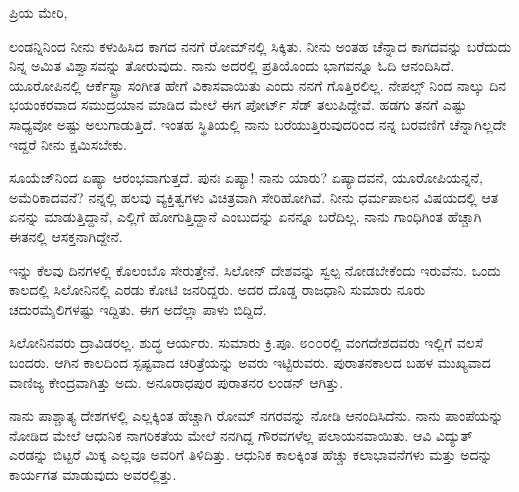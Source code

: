 \noindent
ಪ್ರಿಯ ಮೇರಿ,

ಲಂಡನ್ನಿನಿಂದ ನೀನು ಕಳುಹಿಸಿದ ಕಾಗದ ನನಗೆ ರೋಮ್‌ನಲ್ಲಿ ಸಿಕ್ಕಿತು. ನೀನು ಅಂತಹ ಚೆನ್ನಾದ ಕಾಗದವನ್ನು ಬರೆದುದು ನಿನ್ನ ಅಮಿತ ವಿಶ್ವಾಸವನ್ನು ತೋರುವುದು. ನಾನು ಅದರಲ್ಲಿ ಪ್ರತಿಯೊಂದು ಭಾಗವನ್ನೂ ಓದಿ ಆನಂದಿಸಿದೆ. ಯೂರೋಪಿನಲ್ಲಿ ಆರ್ಕೆಸ್ಟ್ರಾ ಸಂಗೀತ ಹೇಗೆ ವಿಕಾಸವಾಯಿತು ಎಂದು ನನಗೆ ಗೊತ್ತಿರಲಿಲ್ಲ. ನೇಪಲ್ಸ್ ನಿಂದ ನಾಲ್ಕು ದಿನ ಭಯಂಕರವಾದ ಸಮುದ್ರಯಾನ ಮಾಡಿದ ಮೇಲೆ ಈಗ ಪೋರ್ಟ್ ಸೆಡ್ ತಲುಪಿದ್ದೇವೆ. ಹಡಗು ತನಗೆ ಎಷ್ಟು ಸಾಧ್ಯವೋ ಅಷ್ಟು ಅಲುಗಾಡುತ್ತಿದೆ. ಇಂತಹ ಸ್ಥಿತಿಯಲ್ಲಿ ನಾನು ಬರೆಯುತ್ತಿರುವುದರಿಂದ ನನ್ನ ಬರವಣಿಗೆ ಚೆನ್ನಾಗಿಲ್ಲದೇ ಇದ್ದರೆ ನೀನು ಕ್ಷಮಿಸಬೇಕು.

ಸೂಯೆಜ್‌ನಿಂದ ಏಷ್ಯಾ ಆರಂಭವಾಗುತ್ತದೆ. ಪುನಃ ಏಷ್ಯಾ! ನಾನು ಯಾರು? ಏಷ್ಯಾದವನೆ, ಯೂರೋಪಿಯನ್ನನೆ, ಅಮೆರಿಕಾದವನೆ? ನನ್ನಲ್ಲಿ ಹಲವು ವ್ಯಕ್ತಿತ್ವಗಳು ವಿಚಿತ್ರವಾಗಿ ಸೇರಿಹೋಗಿವೆ. ನೀನು ಧರ್ಮಪಾಲನ ವಿಷಯದಲ್ಲಿ ಆತ ಏನನ್ನು ಮಾಡುತ್ತಿದ್ದಾನೆ, ಎಲ್ಲಿಗೆ ಹೋಗುತ್ತಿದ್ದಾನೆ ಎಂಬುದನ್ನು ಏನನ್ನೂ ಬರೆದಿಲ್ಲ. ನಾನು ಗಾಂಧಿಗಿಂತ ಹೆಚ್ಚಾಗಿ ಈತನಲ್ಲಿ ಆಸಕ್ತನಾಗಿದ್ದೇನೆ.

ಇನ್ನು ಕೆಲವು ದಿನಗಳಲ್ಲಿ ಕೊಲಂಬೊ ಸೇರುತ್ತೇನೆ. ಸಿಲೋನ್ ದೇಶವನ್ನು ಸ್ವಲ್ಪ ನೋಡಬೇಕೆಂದು ಇರುವೆನು. ಒಂದು ಕಾಲದಲ್ಲಿ ಸಿಲೋನಿನಲ್ಲಿ ಎರಡು ಕೋಟಿ ಜನರಿದ್ದರು. ಅದರ ದೊಡ್ಡ ರಾಜಧಾನಿ ಸುಮಾರು ನೂರು ಚದುರಮೈಲಿಗಳಷ್ಟು ಇದ್ದಿತು. ಈಗ ಅದೆಲ್ಲಾ ಪಾಳು ಬಿದ್ದಿದೆ.

ಸಿಲೋನಿನವರು ದ್ರಾವಿಡರಲ್ಲ. ಶುದ್ಧ ಆರ್ಯರು. ಸುಮಾರು ಕ್ರಿ.ಪೂ. ೮೦೦ರಲ್ಲಿ ವಂಗದೇಶದವರು ಇಲ್ಲಿಗೆ ವಲಸೆ ಬಂದರು. ಆಗಿನ ಕಾಲದಿಂದ ಸ್ಪಷ್ಟವಾದ ಚರಿತ್ರೆಯನ್ನು ಅವರು ಇಟ್ಟಿರುವರು. ಪುರಾತನಕಾಲದ ಬಹಳ ಮುಖ್ಯವಾದ ವಾಣಿಜ್ಯ ಕೇಂದ್ರವಾಗಿತ್ತು ಅದು. ಅನೂರಾಧಪುರ ಪುರಾತನರ ಲಂಡನ್ ಆಗಿತ್ತು.

ನಾನು ಪಾಶ್ಚಾತ್ಯ ದೇಶಗಳಲ್ಲಿ ಎಲ್ಲಕ್ಕಿಂತ ಹೆಚ್ಚಾಗಿ ರೋಮ್ ನಗರವನ್ನು ನೋಡಿ ಆನಂದಿಸಿದೆನು. ನಾನು ಪಾಂಪೆಯನ್ನು ನೋಡಿದ ಮೇಲೆ ಆಧುನಿಕ ನಾಗರಿಕತೆಯ ಮೇಲೆ ನನಗಿದ್ದ ಗೌರವಗಳೆಲ್ಲ ಪಲಾಯನವಾಯಿತು. ಆವಿ ವಿದ್ಯುತ್ ಎರಡನ್ನು ಬಿಟ್ಟರೆ ಮಿಕ್ಕ ಎಲ್ಲವೂ ಅವರಿಗೆ ತಿಳಿದಿತ್ತು. ಆಧುನಿಕ ಕಾಲಕ್ಕಿಂತ ಹೆಚ್ಚು ಕಲಾಭಾವನೆಗಳು ಮತ್ತು ಅದನ್ನು ಕಾರ್ಯಗತ ಮಾಡುವುದು ಅವರಲ್ಲಿತ್ತು.

{\fontsize{12.45pt}{12pt}\selectfont{ಗ್ರೀಕರಲ್ಲಿದ್ದಂತೆ ಮಾನವ ಆಕೃತಿಗಳನ್ನು ಕೊರೆಯುವ ಕಲೆ ಭಾರತದಲ್ಲಿ ಬೆಳೆಯಲಿಲ್ಲ ಎಂದು ನಾನು ಹೇಳಿದ್ದು ಸರಿಯಲ್ಲವೆಂದು ಮಿಸ್‌ಲಾಕ್‌ಗೆ ದಯವಿಟ್ಟು ತಿಳಿಸು. ಈ ವಿಷಯದಲ್ಲಿ ಅಧಿಕಾರವಾಣಿಯಿಂದ ಬರೆದಿರುವ ಫರ್ಗುಸನ್ ಮತ್ತು ಇತರರ ಗ್ರಂಥಗಳನ್ನು ನಾನು ಓದುತ್ತಿದ್ದೆ. ಅವರು ಒರಿಸ್ಸಾ ಅಥವಾ ಜಗನ್ನಾಥದ ಸಮೀಪದಲ್ಲಿರುವ ಪಾಳು ಕಟ್ಟಡಗಳಲ್ಲಿ ಕೆಲವು ಕಲ್ಲಿನಂತೆ ಕೊರೆದ ಮಾನವಾಕೃತಿಗಳಿರುವುವು ಎಂದೂ ಸೌಂದರ್ಯ ಮತ್ತು ಅಂಗರಚನಾ ಕೌಶಲ್ಯದ ದೃಷ್ಟಿಯಿಂದ ಅವುಗಳನ್ನು ಗ್ರೀಕ್ ದೇಶದ ಯಾವ ಕೃತಿಯೊಂದಿಗೆ ಬೇಕಾದರೂ ಹೋಲಿಸಬಹುದು ಎಂದೂ ಹೇಳುತ್ತಾರೆ. ಅಲ್ಲಿ ಮೃತ್ಯುವಿನ ಒಂದು ಭೀಮಾಕಾರದ ವಿಗ್ರಹವಿದೆ. ಬಾಡಿಹೋದ ಚರ್ಮದಿಂದ ಆವೃತವಾದ ಸ್ತ್ರೀ ದೇಹದ ಅಸ್ತಿಪಂಜರವಿದೆ. ಅಲ್ಲಿ ಕಾಣುವ ಸೂಕ್ಷ್ಮ ಅಂಗರಚನೆಯ ಸಹಜಸ್ಥಿತಿ ಭೀಕರವಾಗಿದೆ ಮತ್ತು ಜುಗುಪ್ಸೆಯನ್ನು ಹುಟ್ಟಿಸುವಂತಿದೆ. ಅಲ್ಲಿ ಒಂದು ಕಡೆ ಕಾಣುವ ಸ್ತ್ರೀಯ ವಿಗ್ರಹ ವೀನಸ್‌ ಡಿ ಮೆಡೀಸಿಯಂತೆ ಇದೆ ಎನ್ನುತ್ತಾರೆ ನನ್ನ ಗ್ರಂಥಕರ್ತರು. ಆದರೆ ಇದನ್ನು ನೀನು ನೆನಪಿನಲ್ಲಿಡಬೇಕು. ಹೆಚ್ಚು ಕಡಿಮೆ ಪ್ರತಿಯೊಂದನ್ನೂ, ವಿಗ್ರಹದ್ವೇಷಿಗಳಾದ ಮಹಮ್ಮದೀಯರು ಧ್ವಂಸಮಾಡಿರುವರು. ಆದರೂ ಏನು ಉಳಿದಿರುವುದೋ ಅದು ಐರೋಪ್ಯ ಪಾಳುಗಳ ಮೊತ್ತಕ್ಕಿಂತಲೂ ಅಧಿಕವಾಗುವುದು. ನಾನು ಎಂಟು ವರುಷಗಳು ಸಂಚಾರ ಮಾಡಿರುವೆನು. ಆದರೆ ಯಾವ ಮಹಾ ಕಲಾಕೃತಿಯನ್ನೂ ನೋಡಲಿಲ್ಲ.}}

